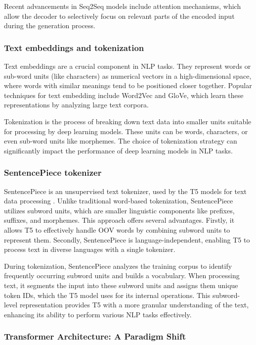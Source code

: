 \documentclass[15pt]{article}
\begin{document}
Recent advancements in Seq2Seq models include attention mechanisms, which allow the decoder to selectively focus on relevant parts of the encoded input during the generation process.

\subsubsection{Text embeddings and tokenization}

Text embeddings are a crucial component in NLP tasks. They represent words or sub-word units (like characters) as numerical vectors in a high-dimensional space, where words with similar meanings tend to be positioned closer together. Popular techniques for text embedding include Word2Vec and GloVe, which learn these representations by analyzing large text corpora.

Tokenization is the process of breaking down text data into smaller units suitable for processing by deep learning models. These units can be words, characters, or even sub-word units like morphemes. The choice of tokenization strategy can significantly impact the performance of deep learning models in NLP tasks.

\subsubsection{SentencePiece tokenizer}

SentencePiece is an unsupervised text tokenizer, used by the T5 models for text data processing \cite{Kudo2018}. Unlike traditional word-based tokenization, SentencePiece utilizes subword units, which are smaller linguistic components like prefixes, suffixes, and morphemes. This approach offers several advantages. Firstly, it allows T5 to effectively handle OOV words by combining subword units to represent them. Secondly, SentencePiece is language-independent, enabling T5 to process text in diverse languages with a single tokenizer.

During tokenization, SentencePiece analyzes the training corpus to identify frequently occurring subword units and builds a vocabulary. When processing text, it segments the input into these subword units and assigns them unique token IDs, which the T5 model uses for its internal operations. This subword-level representation provides T5 with a more granular understanding of the text, enhancing its ability to perform various NLP tasks effectively.

\subsubsection{Transformer Architecture: A Paradigm Shift}
\end{document}
